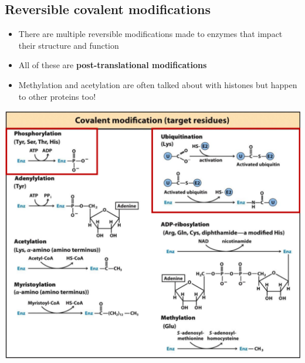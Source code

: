 \documentclass[10pt]{article}
\begin{document}
\subsection*{Reversible covalent modifications}
\begin{itemize}
	\item There are multiple reversible modifications made to enzymes that impact their structure and function
	\item All of these are \textbf{post-translational modifications}
	\item Methylation and acetylation are often talked about with histones but happen to other proteins too!
\end{itemize}
\begin{center}
    \includegraphics*[scale=0.6]{L1_10.png}
\end{center}
\end{document}
